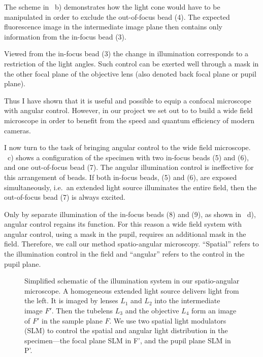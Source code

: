 The scheme in ~b) demonstrates how the light
cone would have to be manipulated in order to exclude the out-of-focus
bead (4). The expected fluorescence image in the intermediate image
plane then contains only information from the in-focus bead (3).

Viewed from the in-focus bead (3) the change in illumination
corresponds to a restriction of the light angles. Such control can be
exerted well through a mask in the other focal plane of the objective
lens (also denoted back focal plane or pupil plane).

Thus I have shown that it is useful and possible to equip a confocal
microscope with angular control. However, in our project we set out to
to build a wide field microscope in order to benefit from the speed
and quantum efficiency of modern cameras.  

I now turn to the task of bringing angular control to the wide field
microscope. ~c) shows a configuration of the
specimen with two in-focus beads (5) and (6), and one out-of-focus
bead (7).  The angular illumination control is ineffective for this
arrangement of beads.  If both in-focus beads, (5) and (6), are
exposed simultaneously, i.e.\ an extended light source illuminates the
entire field, then the out-of-focus bead (7) is always excited.

Only by separate illumination of the in-focus beads (8) and (9), as
shown in ~d), angular control regains its
function. For this reason a wide field system with angular control,
using a mask in the pupil, requires an additional mask in the field.
Therefore, we call our method spatio-angular microscopy. ``Spatial''
refers to the illumination control in the field and ``angular'' refers
to the control in the pupil plane.


\begin{figure}[!hbt] \centering {}
  \caption{Simplified schematic of the illumination system in our
spatio-angular microscope. A homogeneous extended light source
delivers light from the left. It is imaged by lenses $L_1$ and $L_2$
into the intermediate image $F'$. Then the tubelens $L_3$ and the
objective $L_4$ form an image of $F'$ in the sample plane $F$. We use
two spatial light modulators (SLM) to control the spatial and angular
light distribution in the specimen---the focal plane SLM in F', and
the pupil plane SLM in P'.}
  \label{fig:memi-simple}
\end{figure}

